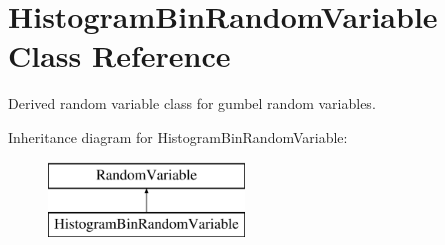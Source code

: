 \section{Histogram\+Bin\+Random\+Variable Class Reference}
\label{classPecos_1_1HistogramBinRandomVariable}


Derived random variable class for gumbel random variables.  


Inheritance diagram for Histogram\+Bin\+Random\+Variable\+:\begin{figure}[H]
\begin{center}
\leavevmode
\includegraphics[height=2.000000cm]{classPecos_1_1HistogramBinRandomVariable}
\end{center}
\end{figure}
